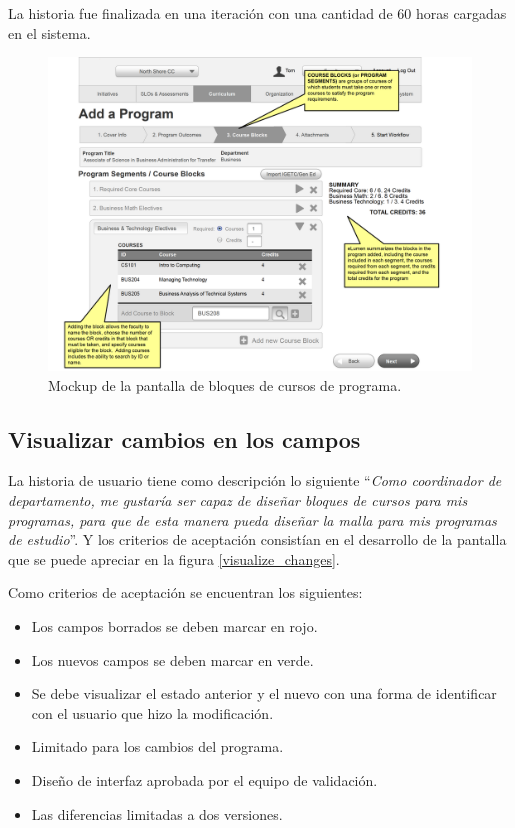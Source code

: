 La historia fue finalizada en una iteración con una cantidad de 60 horas cargadas en el sistema.

\begin{figure}[H]
\centering
\includegraphics[width=125mm,scale=1]{Capitulos/DesarrollodelaAplicacion/Imagenes/program_course_blocks}
\caption{Mockup de la pantalla de bloques de cursos de programa.}
  \label{program_course_blocks}
\end{figure}

\subsection{Visualizar cambios en los campos}
La historia de usuario tiene como descripción lo siguiente \enquote{\textit{Como coordinador de departamento, me gustaría ser capaz de diseñar bloques de cursos para mis programas, para que de esta manera pueda diseñar la malla para mis programas de estudio}}. Y los criterios de aceptación consistían en el desarrollo de la pantalla que se puede apreciar en la figura \ref{visualize_changes}.

Como criterios de aceptación se encuentran los siguientes:
\begin{itemize}
	\item Los campos borrados se deben marcar en rojo.
	\item Los nuevos campos se deben marcar en verde.
	\item Se debe visualizar el estado anterior y el nuevo con una forma de identificar con el usuario que hizo la modificación.
	\item Limitado para los cambios del programa.
	\item Diseño de interfaz aprobada por el equipo de validación.
	\item Las diferencias limitadas a dos versiones.
\end{itemize}

